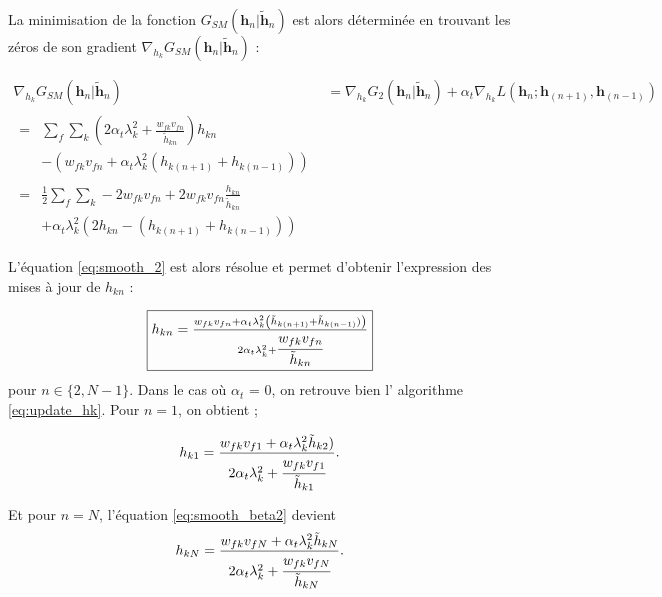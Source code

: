 La minimisation de la fonction $G_{SM}(\mathbf{h}_{n}\vert \mathbf{\tilde{h}}_{n})$ est alors déterminée en trouvant les zéros de son gradient $\nabla_{h_k} G_{SM}(\mathbf{h}_{n}\vert \mathbf{\tilde{h}}_{n})$ :

\begin{align}
\nabla_{h_{k}} G_{SM}(\mathbf{h}_{n}\vert \mathbf{\tilde{h}}_{n}) &= \nabla_{h_{k}} G_{2}(\mathbf{h}_{n}\vert \mathbf{\tilde{h}}_{n}) + \alpha_t \nabla_{h_{k}} L(\mathbf{h}_{n}; \mathbf{h}_{(n+1)}, \mathbf{h}_{(n-1)})\\
\begin{split}
    ={}& \sum_{f} \sum_{k} \left( 2\alpha_t \lambda_k^2 + \frac{w_{fk} v_{fn}}{\tilde{h}_{kn}}\right)h_{kn} \\
    & - \left(w_{fk} v_{fn} + \alpha_t \lambda_k^2 \left(h_{k(n+1)}+h_{k(n-1)}\right)\right) 
    \end{split}\\
\begin{split}
    ={}& \frac{1}{2}\sum_{f} \sum_{k} -2 w_{fk} v_{fn} + 2 w_{fk} v_{fn} \frac{h_{kn}}{\tilde{h}_{kn}} \\
    & + \alpha_t \lambda_k^2 \left( 2 h_{kn}- (h_{k(n+1)}+h_{k(n-1)}) \right)\label{eq:smooth_2}
\end{split}
\end{align}


L'équation \ref{eq:smooth_2} est alors résolue et permet d'obtenir l'expression des mises à jour de $h_{kn}$ : 

\begin{equation}\label{eq:smooth_beta2}
\fbox{$
h_{kn} = \frac{w_{fk} v_{fn}+\alpha_t  \lambda_k^2 \left(\tilde{h}_{k(n+1)}+\tilde{h}_{k(n-1)})\right)}{2\alpha_t \lambda_k^2 + \cfrac{w_{fk} v_{fn}} {\tilde{h}_{kn}}}$}
\end{equation}
pour $n \in \lbrace 2, N-1 \rbrace$. Dans le cas où $\alpha_t$ = 0, on retrouve bien l' algorithme \ref{eq:update_hk}. Pour $n = 1$, on obtient ; 

\begin{equation}
h_{k1} = \frac{w_{fk} v_{f1}+\alpha_t \lambda_k^2 \tilde{h}_{k2})}{2\alpha_t \lambda_k^2 + \cfrac{w_{fk} v_{f1}}{\tilde{h}_{k1}}}.
\end{equation}

Et pour $n = N$, l'équation \ref{eq:smooth_beta2} devient 
\begin{equation}
h_{kN} = \frac{w_{fk} v_{fN}+\alpha_t  \lambda_k^2 \tilde{h}_{kN}}{2\alpha_t \lambda_k^2 + \cfrac{w_{fk} v_{fN}} {\tilde{h}_{kN}}}.
\end{equation}

